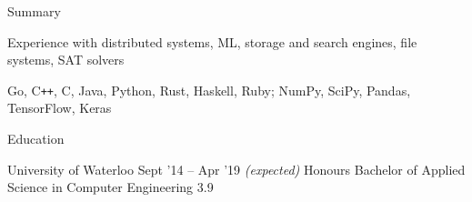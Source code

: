 \documentclass{resume} %
\begin{document}

\begin{rSection}{Summary}
  \begin{rSummarySection}
  {
    \item Experience with distributed systems, ML, storage and search engines,
      file systems, SAT solvers
    \item Go, C\texttt{++}, C, Java, Python, Rust, Haskell, Ruby; NumPy, SciPy,
      Pandas, TensorFlow, Keras
  }
  \end{rSummarySection}
\end{rSection}


\begin{rSection}{Education}
  \begin{rEducationSection}{University of Waterloo}
                           {Sept '14 -- Apr '19 \em (expected)}
                           {Honours Bachelor of Applied Science in Computer Engineering}
                           {3.9}
  \end{rEducationSection}
\end{rSection}

\end{document}
